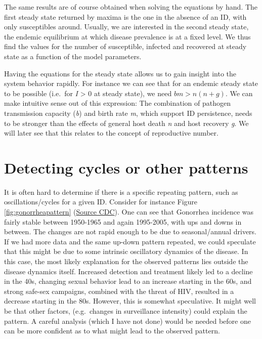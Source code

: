 \documentclass[]{book}
\theoremstyle{definition}
\theoremstyle{definition}
\theoremstyle{definition}
\theoremstyle{remark}
\begin{document}
The same results are of course obtained when solving the equations by
hand. The first steady state returned by maxima is the one in the
absence of an ID, with only susceptibles around. Usually, we are
interested in the second steady state, the endemic equilibrium at which
disease prevalence is at a fixed level. We thus find the values for the
number of susceptible, infected and recovered at steady state as a
function of the model parameters.

Having the equations for the steady state allows us to gain insight into
the system behavior rapidly. For instance we can see that for an endemic
steady state to be possible (i.e.~for \emph{I} \textgreater{} 0 at
steady state), we need \(b m > n (n+ g)\). We can make intuitive sense
out of this expression: The combination of pathogen transmission
capacity (\emph{b}) and birth rate \emph{m}, which support ID
persistence, needs to be stronger than the effects of general host death
\emph{n} and host recovery \emph{g}. We will later see that this relates
to the concept of reproductive number.

\section{Detecting cycles or other
patterns}\label{detecting-cycles-or-other-patterns}

It is often hard to determine if there is a specific repeating pattern,
such as oscillations/cycles for a given ID. Consider for instance Figure
\ref{fig:gonorrheapattern}
(\href{http://www.cdc.gov/STD/stats06/images/trends-img-2.gif}{Source
CDC}). One can see that Gonorrhea incidence was fairly stable between
1950-1965 and again 1995-2005, with ups and downs in between. The
changes are not rapid enough to be due to seasonal/annual drivers. If we
had more data and the same up-down pattern repeated, we could speculate
that this might be due to some intrinsic oscillatory dynamics of the
disease. In this case, the most likely explanation for the observed
patterns lies outside the disease dynamics itself. Increased detection
and treatment likely led to a decline in the 40s, changing sexual
behavior lead to an increase starting in the 60s, and strong safe-sex
campaigns, combined with the threat of HIV, resulted in a decrease
starting in the 80s. However, this is somewhat speculative. It might
well be that other factors, (e.g.~changes in surveillance intensity)
could explain the pattern. A careful analysis (which I have not done)
would be needed before one can be more confident as to what might lead
to the observed pattern.
\end{document}
